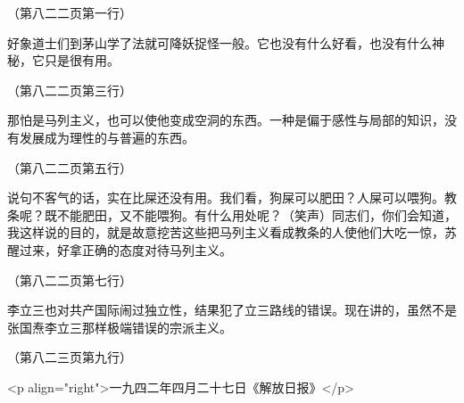 （第八二二页第一行）

好象道士们到茅山学了法就可降妖捉怪一般。它也没有什么好看，也没有什么神秘，它只是很有用。

（第八二二页第三行）

那怕是马列主义，也可以使他变成空洞的东西。一种是偏于感性与局部的知识，没有发展成为理性的与普遍的东西。

（第八二二页第五行）

说句不客气的话，实在比屎还没有用。我们看，狗屎可以肥田？人屎可以喂狗。教条呢？既不能肥田，又不能喂狗。有什么用处呢？（笑声）同志们，你们会知道，我这样说的目的，就是故意挖苦这些把马列主义看成教条的人使他们大吃一惊，苏醒过来，好拿正确的态度对待马列主义。

（第八二二页第七行）

李立三也对共产国际闹过独立性，结果犯了立三路线的错误。现在讲的，虽然不是张国焘李立三那样极端错误的宗派主义。

（第八二三页第九行）

<p align="right">一九四二年四月二十七日《解放日报》</p>


